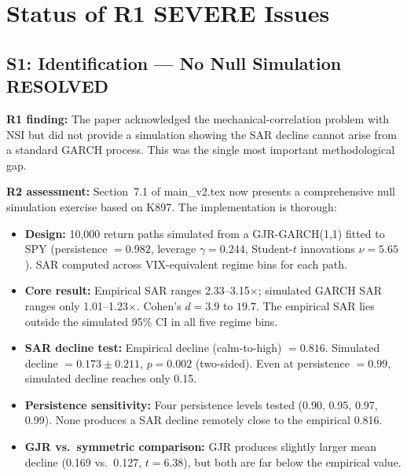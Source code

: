 \documentclass[12pt,a4paper]{article}
\begin{document}
\bigskip

\section*{Status of R1 SEVERE Issues}

\subsection*{S1: Identification --- No Null Simulation \hfill \textcolor{okgreen}{RESOLVED}}

\textbf{R1 finding:} The paper acknowledged the mechanical-correlation problem with NSI but did not provide a simulation showing the SAR decline cannot arise from a standard GARCH process. This was the single most important methodological gap.

\textbf{R2 assessment:} Section~7.1 of main\_v2.tex now presents a comprehensive null simulation exercise based on K897. The implementation is thorough:

\begin{itemize}[nosep]
\item \textbf{Design:} 10,000 return paths simulated from a GJR-GARCH(1,1) fitted to SPY (persistence $= 0.982$, leverage $\gamma = 0.244$, Student-$t$ innovations $\nu = 5.65$). SAR computed across VIX-equivalent regime bins for each path.
\item \textbf{Core result:} Empirical SAR ranges 2.33--3.15$\times$; simulated GARCH SAR ranges only 1.01--1.23$\times$. Cohen's $d = 3.9$ to $19.7$. The empirical SAR lies outside the simulated 95\% CI in all five regime bins.
\item \textbf{SAR decline test:} Empirical decline (calm-to-high) $= 0.816$. Simulated decline $= 0.173 \pm 0.211$, $p = 0.002$ (two-sided). Even at persistence $= 0.99$, simulated decline reaches only 0.15.
\item \textbf{Persistence sensitivity:} Four persistence levels tested (0.90, 0.95, 0.97, 0.99). None produces a SAR decline remotely close to the empirical 0.816.
\item \textbf{GJR vs.\ symmetric comparison:} GJR produces slightly larger mean decline (0.169 vs.\ 0.127, $t = 6.38$), but both are far below the empirical value.
\end{itemize}
\end{document}

